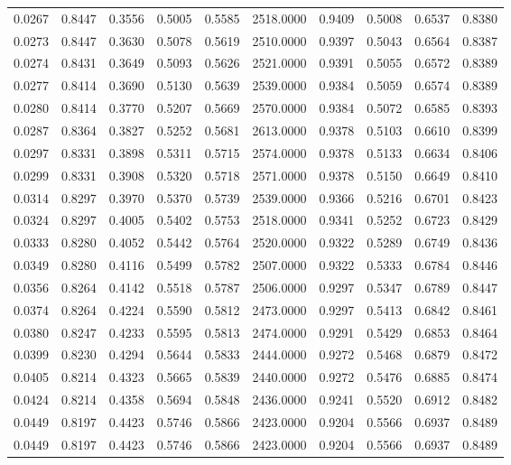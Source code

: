 \begin{tabular}{rrrrrrrrrr}
0.0267 & 0.8447 & 0.3556 & 0.5005 & 0.5585 & 2518.0000 & 0.9409 & 0.5008 & 0.6537 & 0.8380 \\
0.0273 & 0.8447 & 0.3630 & 0.5078 & 0.5619 & 2510.0000 & 0.9397 & 0.5043 & 0.6564 & 0.8387 \\
0.0274 & 0.8431 & 0.3649 & 0.5093 & 0.5626 & 2521.0000 & 0.9391 & 0.5055 & 0.6572 & 0.8389 \\
0.0277 & 0.8414 & 0.3690 & 0.5130 & 0.5639 & 2539.0000 & 0.9384 & 0.5059 & 0.6574 & 0.8389 \\
0.0280 & 0.8414 & 0.3770 & 0.5207 & 0.5669 & 2570.0000 & 0.9384 & 0.5072 & 0.6585 & 0.8393 \\
0.0287 & 0.8364 & 0.3827 & 0.5252 & 0.5681 & 2613.0000 & 0.9378 & 0.5103 & 0.6610 & 0.8399 \\
0.0297 & 0.8331 & 0.3898 & 0.5311 & 0.5715 & 2574.0000 & 0.9378 & 0.5133 & 0.6634 & 0.8406 \\
0.0299 & 0.8331 & 0.3908 & 0.5320 & 0.5718 & 2571.0000 & 0.9378 & 0.5150 & 0.6649 & 0.8410 \\
0.0314 & 0.8297 & 0.3970 & 0.5370 & 0.5739 & 2539.0000 & 0.9366 & 0.5216 & 0.6701 & 0.8423 \\
0.0324 & 0.8297 & 0.4005 & 0.5402 & 0.5753 & 2518.0000 & 0.9341 & 0.5252 & 0.6723 & 0.8429 \\
0.0333 & 0.8280 & 0.4052 & 0.5442 & 0.5764 & 2520.0000 & 0.9322 & 0.5289 & 0.6749 & 0.8436 \\
0.0349 & 0.8280 & 0.4116 & 0.5499 & 0.5782 & 2507.0000 & 0.9322 & 0.5333 & 0.6784 & 0.8446 \\
0.0356 & 0.8264 & 0.4142 & 0.5518 & 0.5787 & 2506.0000 & 0.9297 & 0.5347 & 0.6789 & 0.8447 \\
0.0374 & 0.8264 & 0.4224 & 0.5590 & 0.5812 & 2473.0000 & 0.9297 & 0.5413 & 0.6842 & 0.8461 \\
0.0380 & 0.8247 & 0.4233 & 0.5595 & 0.5813 & 2474.0000 & 0.9291 & 0.5429 & 0.6853 & 0.8464 \\
0.0399 & 0.8230 & 0.4294 & 0.5644 & 0.5833 & 2444.0000 & 0.9272 & 0.5468 & 0.6879 & 0.8472 \\
0.0405 & 0.8214 & 0.4323 & 0.5665 & 0.5839 & 2440.0000 & 0.9272 & 0.5476 & 0.6885 & 0.8474 \\
0.0424 & 0.8214 & 0.4358 & 0.5694 & 0.5848 & 2436.0000 & 0.9241 & 0.5520 & 0.6912 & 0.8482 \\
0.0449 & 0.8197 & 0.4423 & 0.5746 & 0.5866 & 2423.0000 & 0.9204 & 0.5566 & 0.6937 & 0.8489 \\
0.0449 & 0.8197 & 0.4423 & 0.5746 & 0.5866 & 2423.0000 & 0.9204 & 0.5566 & 0.6937 & 0.8489 \\

\end{tabular}
